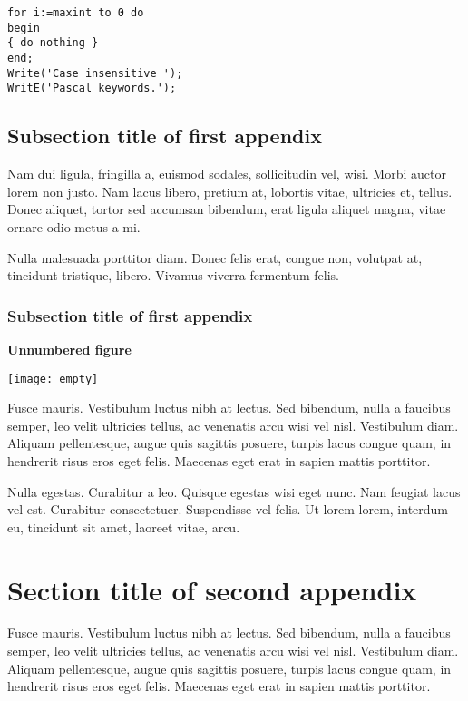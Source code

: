 \documentclass[proof]{WileyASNA-v1}
\begin{document}
\begin{lstlisting}[caption={Descriptive Caption Text},label=DescriptiveLabel]
for i:=maxint to 0 do
begin
{ do nothing }
end;
Write('Case insensitive ');
WritE('Pascal keywords.');
\end{lstlisting}



\subsection{Subsection title of first appendix\label{app1.1a}}

Nam dui ligula, fringilla a, euismod sodales, sollicitudin vel, wisi. Morbi auctor lorem non justo. Nam lacus libero,
pretium at, lobortis vitae, ultricies et, tellus. Donec aliquet, tortor sed accumsan bibendum, erat ligula aliquet magna,
vitae ornare odio metus a mi. 

Nulla malesuada porttitor diam. Donec felis erat, congue non, volutpat at, tincidunt tristique, libero. Vivamus
viverra fermentum felis. 

\subsubsection{Subsection title of first appendix\label{app1.1.1a}}

\noindent\textbf{Unnumbered figure}


\begin{center}
\texttt{[image: empty]}
\end{center}


Fusce mauris. Vestibulum luctus nibh at lectus. Sed bibendum, nulla a faucibus semper, leo velit ultricies tellus, ac
venenatis arcu wisi vel nisl. Vestibulum diam. Aliquam pellentesque, augue quis sagittis posuere, turpis lacus congue
quam, in hendrerit risus eros eget felis. Maecenas eget erat in sapien mattis porttitor. 

Nulla egestas. Curabitur a leo. Quisque egestas wisi eget nunc. Nam feugiat lacus vel est. Curabitur consectetuer.
Suspendisse vel felis. Ut lorem lorem, interdum eu, tincidunt sit amet, laoreet vitae, arcu. 

\section{Section title of second appendix\label{app2}}%

Fusce mauris. Vestibulum luctus nibh at lectus. Sed bibendum, nulla a faucibus semper, leo velit ultricies tellus, ac
venenatis arcu wisi vel nisl. Vestibulum diam. Aliquam pellentesque, augue quis sagittis posuere, turpis lacus congue
quam, in hendrerit risus eros eget felis. Maecenas eget erat in sapien mattis porttitor. 
\end{document}
